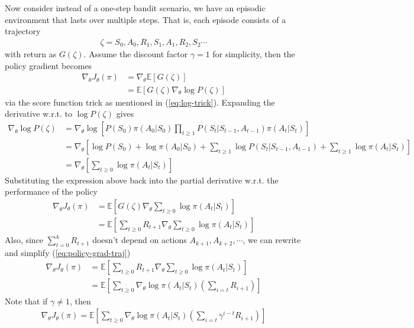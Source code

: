 \documentclass[12pt]{report}
\begin{document}
Now consider instead of a one-step bandit scenario, we have an episodic environment that lasts over multiple steps. That is, each episode consists of a trajectory
\begin{align}
	\zeta = S_0, A_0, R_1, S_1, A_1, R_2, S_2 \cdots \nonumber
\end{align}
with return as $G(\zeta)$. Assume the discount factor $\gamma = 1$ for simplicity, then the policy gradient becomes
\begin{align}
\nabla_\theta J_\theta (\pi) &= \nabla_\theta \mathbb{E}[G(\zeta)]\nonumber\\
&= \mathbb{E}[G(\zeta)\nabla_\theta \log P(\zeta)] \label{eq:policy-grad-traj}
\end{align}
via the score function trick as mentioned in (\ref{eq:log-trick}). Expanding the derivative w.r.t. to $\log P(\zeta)$ gives
\begin{align}
    \nabla_\theta \log P(\zeta) &= \nabla_\theta \log \left[P(S_0)\pi(A_0|S_0) \prod_{t\ge1} P(S_t|S_{t-1},A_{t-1})\pi(A_t|S_t) \right]\nonumber\\
    &=\nabla_\theta \left[\log P(S_0) + \log \pi(A_0|S_0) + \sum_{t\ge 1}\log P(S_t|S_{t-1},A_{t-1}) + \sum_{t\ge 1}\log \pi(A_t|S_t)\right]\nonumber\\
    &= \nabla_\theta \left[\sum_{t\ge0} \log \pi (A_t|S_t)\right]\nonumber
\end{align}
Substituting the expression above back into the partial derivative w.r.t. the performance of the policy
\begin{align}
    \nabla_\theta J_\theta(\pi) &= \mathbb{E}\left[G(\zeta) \nabla_\theta \sum_{t\ge0} \log \pi(A_t|S_t)\right]\nonumber\\
    &=\mathbb{E}\left[\sum_{t\ge0}R_{t+1} \nabla_\theta \sum_{t\ge0} \log \pi(A_t|S_t)\right] \nonumber
\end{align}
Also, since $\sum_{t=0}^k R_{t+1}$ doesn't depend on actions $A_{k+1}, A_{k+2}, \cdots$, we can rewrite and simplify (\ref{eq:policy-grad-traj})
\begin{align}
\nabla_\theta J_\theta(\pi) &= \mathbb{E}\left[\sum_{t\ge0} R_{t+1} \nabla_\theta \sum_{t\ge0} \log \pi(A_t|S_t)\right] \nonumber\\
&= \mathbb{E}\left[\sum_{t\ge0} \nabla_\theta \log \pi(A_t|S_t) \left(\sum_{i=t} R_{i+1}\right)\right] \label{eq:REINFORCE}
\end{align}
Note that if $\gamma \neq 1$, then
\begin{align}
\nabla_\theta J_\theta(\pi) = \mathbb{E}\left[\sum_{t\ge0}\nabla_\theta  \log \pi(A_t|S_t) \left(\sum_{i=t} \gamma^{i-t} R_{i+1}\right) \right] \label{eq1}
\end{align}
\end{document}
